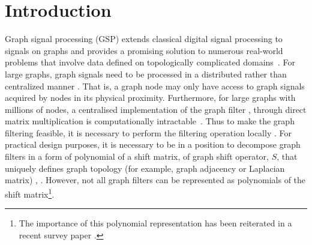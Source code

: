 \documentclass[journal]{IEEEtran}
\begin{document}
\section{Introduction}
\label{sec:intro}
Graph signal processing (GSP) extends classical digital signal processing to signals on graphs and provides a promising solution to numerous real-world problems that involve data defined on topologically complicated domains~\cite{Liyanchen2018}. For large graphs, graph signals need to be processed in a distributed rather than centralized manner \cite{sandryhaila_2014_big_data}. That is, a graph node may only have access to graph signals acquired by nodes in its physical proximity. Furthermore, for large graphs with millions of nodes, a centralised implementation of
the graph filter \cite{Shuman_2013_The_emerging_field}, \cite{ortega2018graph} through direct matrix multiplication is computationally intractable~\cite{segarra2017optimal,coutino2019advances}.
Thus to make the graph filtering feasible, it is necessary to perform
the filtering operation locally \cite{sandryhaila_2014_big_data}. 
For practical design purposes,
it is necessary to be in a position to decompose graph filters in
a form of polynomial of a shift matrix, of graph shift operator, $S$, that uniquely defines graph topology
(for example, graph adjacency or Laplacian matrix)
\cite{sandryhaila_2013_discrete}, \cite{segarra2017network}. 
However, not all graph filters can be represented as polynomials of the shift matrix\footnote{The importance of this polynomial representation has been reiterated in a recent survey paper \cite{ortega2018graph}.}.



\end{document}
